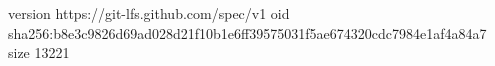 version https://git-lfs.github.com/spec/v1
oid sha256:b8e3c9826d69ad028d21f10b1e6ff39575031f5ae674320cdc7984e1af4a84a7
size 13221
